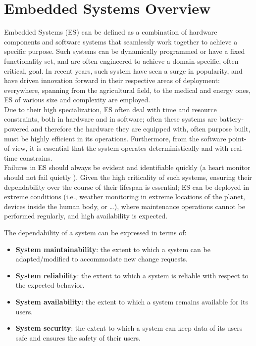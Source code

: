 \section{Embedded Systems Overview}
Embedded Systems (ES) can be defined as a combination of hardware components and software systems that seamlessly work together to achieve a specific purpose. Such systems can be dynamically programmed or have a fixed functionality set, and are often engineered to achieve a domain-specific, often critical, goal.
In recent years, such system have seen a surge in popularity, and have driven innovation forward in their respective areas of deployment: everywhere, spanning from the agricultural field, to the medical and energy ones, ES of various size and complexity are employed. \\
Due to their high specialization, ES often deal with time and resource constraints, both in hardware and in software; often these systems are battery-powered and therefore the hardware they are equipped with, often purpose built, must be highly efficient in its operations. Furthermore, from the software point-of-view, it is essential that the system operates deterministically and with real-time constrains. \\
Failures in ES should always be evident and identifiable quickly (a heart monitor should not fail quietly \cite{MakingEmbeddedSystems}). Given the high criticality of such systems, ensuring their dependability over the course of their lifespan is essential; ES can be deployed in extreme conditions (i.e., weather monitoring in extreme locations of the planet, devices inside the human body, or \dots), where maintenance operations cannot be performed regularly,  and high availability is expected. 

The dependability of a system can be expressed in terms of:
\begin{itemize}
    \item \textbf{System maintainability}: the extent to which a system can be adapted/modified to accommodate new change requests.
    \item \textbf{System reliability}: the extent to which a system is reliable with respect to the expected behavior.
    \item \textbf{System availability}: the extent to which a system remains available for its users.
    \item \textbf{System security}: the extent to which a system can keep data of its users safe and ensures the safety of their users.
\end{itemize}


